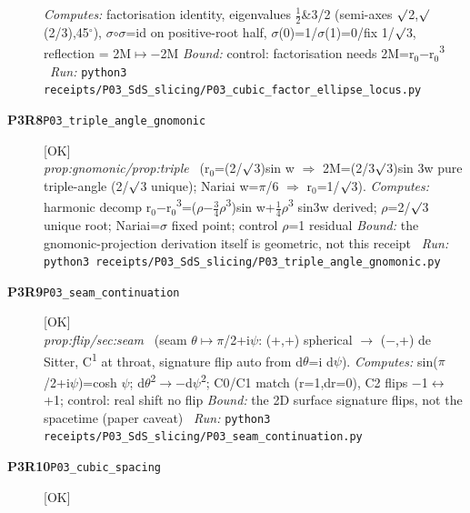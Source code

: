 \begin{description}
\emph{Computes:} factorisation identity, eigenvalues \ensuremath{\tfrac12}\&3/2 (semi-axes \ensuremath{\surd}2,\ensuremath{\surd}(2/3),45\ensuremath{^\circ}), \ensuremath{\sigma}\ensuremath{\circ}\ensuremath{\sigma}=id on positive-root half, \ensuremath{\sigma}(0)=1/\ensuremath{\sigma}(1)=0/fix 1/\ensuremath{\surd}3, reflection = 2M\ensuremath{\mapsto}\ensuremath{-}2M
 \emph{Bound:} control: factorisation needs 2M=r\ensuremath{_0}\ensuremath{-}r\ensuremath{_0}\textsuperscript{3}
\ \emph{Run:} \texttt{python3 receipts/P03\_SdS\_slicing/P03\_cubic\_factor\_ellipse\_locus.py}
\item[\rcptlabel{P03_triple_angle_gnomonic}{P3R8}\textbf{P3R8}\quad\texttt{P03\_triple\_angle\_gnomonic}]\hfill\textsf{[OK]}\\
\textit{prop:gnomonic/prop:triple} \ (r\ensuremath{_0}=(2/\ensuremath{\surd}3)sin w \ensuremath{\Rightarrow} 2M=(2/3\ensuremath{\surd}3)sin 3w pure triple-angle (2/\ensuremath{\surd}3 unique); Nariai w=\ensuremath{\pi}/6 \ensuremath{\Rightarrow} r\ensuremath{_0}=1/\ensuremath{\surd}3). 
\emph{Computes:} harmonic decomp r\ensuremath{_0}\ensuremath{-}r\ensuremath{_0}\textsuperscript{3}=(\ensuremath{\rho}\ensuremath{-}\ensuremath{\tfrac34}\ensuremath{\rho}\textsuperscript{3})sin w+\ensuremath{\tfrac14}\ensuremath{\rho}\textsuperscript{3} sin3w derived; \ensuremath{\rho}=2/\ensuremath{\surd}3 unique root; Nariai=\ensuremath{\sigma} fixed point; control \ensuremath{\rho}=1 residual
 \emph{Bound:} the gnomonic-projection derivation itself is geometric, not this receipt
\ \emph{Run:} \texttt{python3 receipts/P03\_SdS\_slicing/P03\_triple\_angle\_gnomonic.py}
\item[\rcptlabel{P03_seam_continuation}{P3R9}\textbf{P3R9}\quad\texttt{P03\_seam\_continuation}]\hfill\textsf{[OK]}\\
\textit{prop:flip/sec:seam} \ (seam \ensuremath{\theta}\ensuremath{\mapsto}\ensuremath{\pi}/2+i\ensuremath{\psi}: (+,+) spherical \ensuremath{\to} (\ensuremath{-},+) de Sitter, C\textsuperscript{1} at throat, signature flip auto from d\ensuremath{\theta}=i d\ensuremath{\psi}). 
\emph{Computes:} sin(\ensuremath{\pi}/2+i\ensuremath{\psi})=cosh \ensuremath{\psi}; d\ensuremath{\theta}\textsuperscript{2}\ensuremath{\to}\ensuremath{-}d\ensuremath{\psi}\textsuperscript{2}; C0/C1 match (r=1,dr=0), C2 flips \ensuremath{-}1\ensuremath{\leftrightarrow}+1; control: real shift no flip
 \emph{Bound:} the 2D surface signature flips, not the spacetime (paper caveat)
\ \emph{Run:} \texttt{python3 receipts/P03\_SdS\_slicing/P03\_seam\_continuation.py}
\item[\rcptlabel{P03_cubic_spacing}{P3R10}\textbf{P3R10}\quad\texttt{P03\_cubic\_spacing}]\hfill\textsf{[OK]}\\

\end{description}
